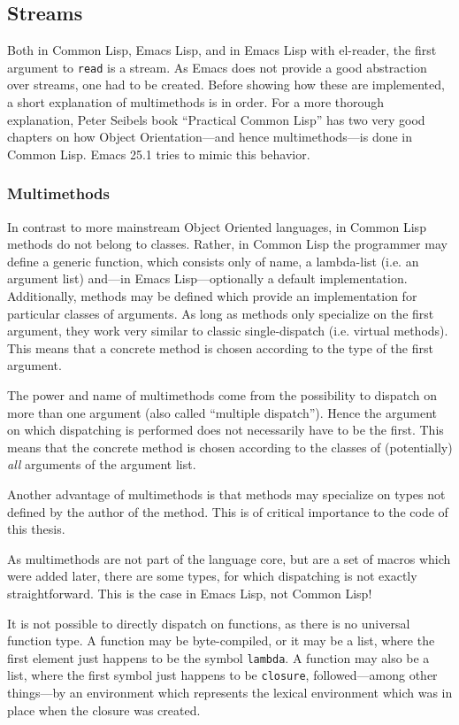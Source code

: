 \documentclass[a4paper,10pt,twoside]{report}
\newcommand{\el}{Emacs Lisp}
\newcommand{\cl}{Common Lisp}
\newcommand{\elr}{el-reader}
\newcommand{\sym}[1]{\texttt{#1}}
\newcommand{\fun}[1]{\texttt{#1}}
\newcommand{\Read}{\fun{read}}
\begin{document}
\subsection{Streams}
\label{subsec:streams}

Both in \cl{}, \el{}, and in \el{} with \elr{}, the first argument to \Read{} is
a stream.  As Emacs does not provide a good abstraction over streams, one had to
be created.  Before showing how these are implemented, a short explanation of
multimethods is in order.  For a more thorough explanation, Peter Seibels book
``Practical Common Lisp'' has two very good chapters on how Object
Orientation---and hence multimethods---is done in \cl{}.\cite{pcl} Emacs 25.1
tries to mimic this behavior.

\subsubsection{Multimethods}
\label{subsubsec:multimethods}

In contrast to more mainstream Object Oriented languages, in \cl{} methods do
not belong to classes.  Rather, in \cl{} the programmer may define a generic
function, which consists only of name, a lambda-list (i.e. an argument list)
and---in \el{}---optionally a default implementation.  Additionally, methods may
be defined which provide an implementation for particular classes of arguments.
As long as methods only specialize on the first argument, they work very similar
to classic single-dispatch (i.e. virtual methods).  This means that a concrete
method is chosen according to the type of the first argument.

The power and name of multimethods come from the possibility to dispatch on more
than one argument (also called ``multiple dispatch'').  Hence the argument on
which dispatching is performed does not necessarily have to be the first.  This
means that the concrete method is chosen according to the classes of
(potentially) \emph{all} arguments of the argument list.

Another advantage of multimethods is that methods may specialize on types not
defined by the author of the method.  This is of critical importance to the code
of this thesis.

As multimethods are not part of the language core, but are a set of macros which
were added later, there are some types, for which dispatching is not exactly
straightforward.  This is the case in \el{}, not \cl{}!

It is not possible to directly dispatch on functions, as there is no universal
function type.  A function may be byte-compiled, or it may be a list, where the
first element just happens to be the symbol \sym{lambda}.  A function may also
be a list, where the first symbol just happens to be \sym{closure},
followed---among other things---by an environment which represents the lexical
environment which was in place when the closure was created.
\end{document}

